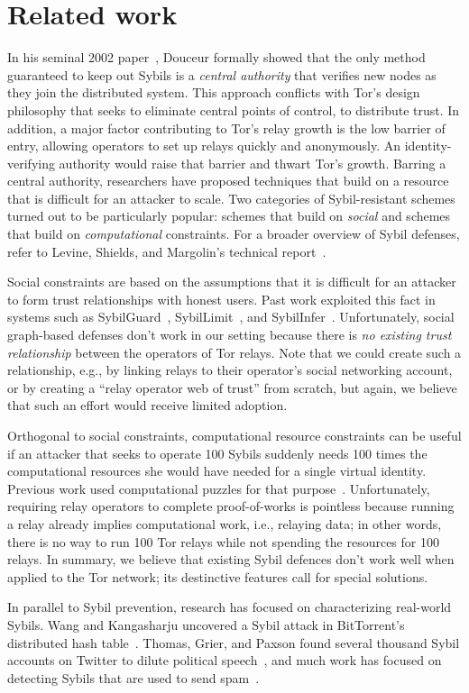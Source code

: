 \section{Related work}
\label{sec:related_work}
In his seminal 2002 paper~\cite{Douceur2002a}, Douceur formally showed that the
only method guaranteed to keep out Sybils is a \emph{central authority} that
verifies new nodes as they join the distributed system.  This approach conflicts
with Tor's design philosophy that seeks to eliminate central points of control,
to distribute trust.  In addition, a major factor contributing to Tor's relay
growth is the low barrier of entry, allowing operators to set up relays quickly
and anonymously.  An identity-verifying authority would raise that barrier and
thwart Tor's growth.  Barring a central authority, researchers have proposed
techniques that build on a resource that is difficult for an attacker to scale.
Two categories of Sybil-resistant schemes turned out to be particularly popular:
schemes that build on \emph{social} and schemes that build on
\emph{computational} constraints.  For a broader overview of Sybil defenses,
refer to Levine, Shields, and Margolin's technical report~\cite{Levine2006a}.

Social constraints are based on the assumptions that it is difficult for an
attacker to form trust relationships with honest users.  Past work exploited
this fact in systems such as SybilGuard~\cite{Yu2006a},
SybilLimit~\cite{Yu2008a}, and SybilInfer~\cite{Danezis2009a}.  Unfortunately,
social graph-based defenses don't work in our setting because there is \emph{no
existing trust relationship} between the operators of Tor relays.  Note that we
could create such a relationship, e.g., by linking relays to their operator's
social networking account, or by creating a ``relay operator web of trust'' from
scratch, but again, we believe that such an effort would receive limited
adoption.

Orthogonal to social constraints, computational resource constraints can be
useful if an attacker that seeks to operate 100 Sybils suddenly needs 100 times
the computational resources she would have needed for a single virtual identity.
Previous work used computational puzzles for that
purpose~\cite{Borisov2006a,Li2012a}.  Unfortunately, requiring relay operators
to complete proof-of-works is pointless because running a relay already implies
computational work, i.e., relaying data; in other words, there is no way to run
100 Tor relays while not spending the resources for 100 relays.  In summary, we
believe that existing Sybil defences don't work well when applied to the Tor
network; its destinctive features call for special solutions.

In parallel to Sybil prevention, research has focused on characterizing
real-world Sybils.  Wang and Kangasharju uncovered a Sybil attack in
BitTorrent's distributed hash table~\cite{Wang2012a}.  Thomas, Grier, and Paxson
found several thousand Sybil accounts on Twitter to dilute political
speech~\cite{Thomas2012a}, and much work has focused on detecting Sybils that
are used to send spam~\cite{Gao2010a}.
